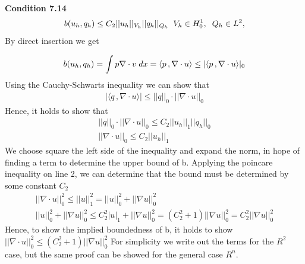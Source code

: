 \documentclass[a4paper,norsk]{article}
\begin{document}
\textbf{Condition 7.14}
\begin{align*}
b(u_h, q_h) \leq C_2 ||u_h||_{V_h} ||q_h||_{Q_h} \hspace{2mm}  V_h \in H_0^1, \hspace{2mm} Q_h \in L^2,
\end{align*}
By direct insertion we get 

\begin{align*}
b(u_h, q_h) = \int p \nabla \cdot v \hspace{1mm} dx = \langle p \,, \nabla \cdot u \rangle \leq | \langle p \,, \nabla \cdot u \rangle |_0
\end{align*}
Using the Cauchy-Schwarts inequality we can show that
\begin{align*}
| \langle q \,, \nabla \cdot u \rangle | \leq ||q||_0 \cdot ||\nabla \cdot u||_0
\end{align*}
Hence, it holds to show that
\begin{align*}
  ||q||_0 \cdot ||\nabla \cdot u||_0 \leq C_2 ||u_h||_{1} ||q_h||_{0} \\
  ||\nabla \cdot u||_0 \leq C_2 ||u_h||_{1} 
\end{align*}
We choose square the left side of the inequality and expand the norm, in hope of finding a term to
determine the upper bound of b. Applying the poincare inequality on line 2, we can determine that the bound must be
determined by some constant $C_2$
\begin{align*}
||\nabla \cdot u||_0^2 \leq ||u||_1^2 = ||u||_0^2 + ||\nabla u ||_0^2 \\
||u||_0^2 + ||\nabla u ||_0^2 \leq C_2^2 |u|_1 + ||\nabla u||_0^2 = (C_2^2 + 1)||\nabla u ||_0^2 = C_2^2||\nabla u ||_0^2
\end{align*}
Hence, to show the implied boundedness of b, it holds to show $||\nabla \cdot u||_0^2 \leq (C_2^2 + 1)||\nabla u ||_0^2$
For simplicity we write out the terms for the $R^2$ case, but the same proof can be showed for the general case $R^n$. 
\end{document}
